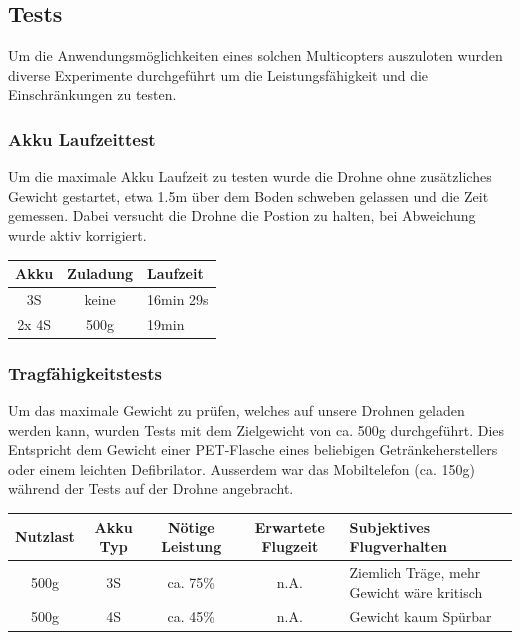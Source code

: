 \subsection{Tests}

Um die Anwendungsmöglichkeiten eines solchen Multicopters auszuloten wurden diverse Experimente durchgeführt um die Leistungsfähigkeit und die Einschränkungen zu testen. 

\subsubsection{Akku Laufzeittest}
Um die maximale Akku Laufzeit zu testen wurde die Drohne ohne zusätzliches Gewicht gestartet, etwa 1.5m über dem Boden schweben gelassen und die Zeit gemessen. Dabei versucht die Drohne die Postion zu halten, bei Abweichung wurde aktiv korrigiert. \\

\begin{tabularx}{\textwidth}{|c|c|X|}
\hline
\textbf{Akku} & \textbf{Zuladung} & \textbf{Laufzeit} \\ \hline \hline 
3S & keine & 16min 29s\\ \hline 
2x 4S & 500g & 19min\\ \hline 
\end{tabularx}
\newpage
\subsubsection{Tragfähigkeitstests}
Um das maximale Gewicht zu prüfen, welches auf unsere Drohnen geladen werden kann, wurden Tests mit dem Zielgewicht von ca. 500g durchgeführt. Dies Entspricht dem Gewicht einer PET-Flasche eines beliebigen Getränkeherstellers oder einem leichten Defibrilator. Ausserdem war das Mobiltelefon (ca. 150g) während der Tests auf der Drohne angebracht.  \\

\begin{tabularx}{\textwidth}{|c|c|c|c|X|}
\hline
\textbf{Nutzlast} & \textbf{Akku Typ} & \textbf{Nötige Leistung }& \textbf{Erwartete Flugzeit } & \textbf{Subjektives Flugverhalten }\\
\hline \hline
500g & 3S & ca. 75\%  & n.A. & Ziemlich Träge, mehr Gewicht wäre kritisch\\\hline
500g & 4S & ca. 45\%  & n.A. & Gewicht kaum Spürbar\\\hline
\end{tabularx}\\

